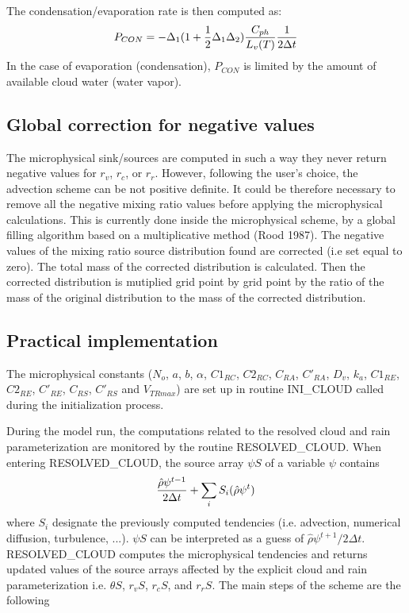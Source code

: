 The condensation/evaporation rate is then computed as:
\begin{equation}
P_{CON}= - \Delta_1 (1 +{1\over 2} \Delta_1 \Delta_2){C_{ph}\over L_v(T)}
{1 \over 2\Delta t}
\end{equation}
In the case of evaporation (condensation), $P_{CON}$ is limited by the amount
of available cloud water (water vapor).

\subsection{Global correction for negative values}
The microphysical sink/sources are computed in such a way they never return
negative values for $r_v$, $r_c$, or $r_r$.
However, following the user's choice, the advection
scheme can be not positive definite. It could be therefore necessary to remove all the
negative mixing ratio values before applying the microphysical calculations.
This is currently done inside the microphysical scheme,
by a global filling algorithm based on a multiplicative method
(Rood 1987). The
negative values of the mixing ratio source distribution found are
corrected (i.e set equal to zero). The total mass of the corrected distribution
is calculated. Then the corrected distribution is mutiplied grid point by
grid point by the ratio of the mass of the original distribution to the mass of
the corrected distribution.

\subsection{Practical implementation}

The microphysical constants ($N_o$, $a$, $b$, $\alpha$, $C1_{RC}$, $C2_{RC}$,
$C_{RA}$, $C'_{RA}$, $D_v$, $k_a$, $C1_{RE}$, $C2_{RE}$, $C'_{RE}$, $C_{RS}$,
$C'_{RS}$ and $V_{TRmax}$) are set up in  routine INI\_CLOUD called during the
initialization process.

During the model run,  the computations related to the resolved cloud and rain
parameterization are  monitored by the routine RESOLVED\_CLOUD. When entering
RESOLVED\_CLOUD, the source array $\psi S$ of a variable $\psi$ contains
$$ {\hat \rho \psi^{t-1} \over {2 \Delta t}} + \sum_i S_i(\hat \rho \psi^t) $$
where  $S_i$ designate the previously computed tendencies (i.e. advection,
numerical diffusion, turbulence, ...). $\psi S$ can be interpreted as a guess
of $\hat \rho \psi^{t+1} / 2 \Delta t$.  RESOLVED\_CLOUD computes the
microphysical tendencies and returns updated
values of the source arrays affected by the explicit cloud and rain
parameterization i.e. $\theta S$, $r_v S$, $r_c S$, and $r_r S$. The main steps
of the scheme are the following

